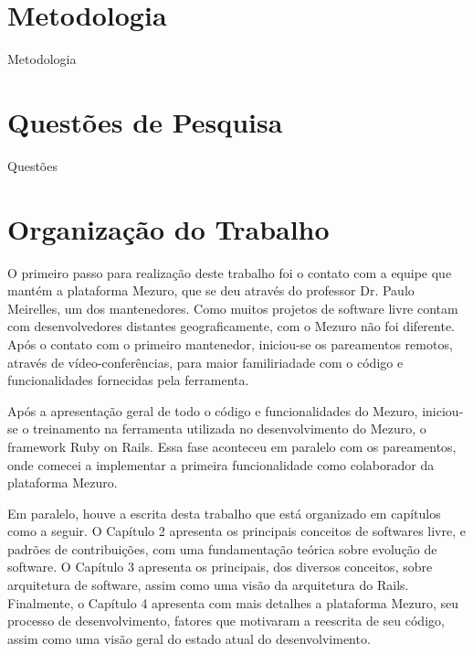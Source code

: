 \section{Metodologia}

Metodologia

\section{Questões de Pesquisa}

Questões

\section{Organização do Trabalho}

O primeiro passo para realização deste trabalho foi o contato com a equipe que mantém a plataforma Mezuro, que se deu através do professor Dr. Paulo Meirelles, um dos mantenedores. Como muitos projetos de software livre contam com desenvolvedores distantes geograficamente, com o Mezuro não foi diferente. Após o contato com o primeiro mantenedor, iniciou-se os pareamentos remotos, através de vídeo-conferências, para maior familiriadade com o código e funcionalidades fornecidas pela ferramenta.

Após a apresentação geral de todo o código e funcionalidades do Mezuro, iniciou-se o treinamento na ferramenta utilizada no desenvolvimento do Mezuro, o framework Ruby on Rails. Essa fase aconteceu em paralelo com os pareamentos, onde comecei a implementar a primeira funcionalidade como colaborador da plataforma Mezuro.

Em paralelo, houve a escrita desta trabalho que está organizado em capítulos como a seguir. O Capítulo 2 apresenta os principais conceitos de softwares livre, e padrões de contribuições, com uma fundamentação teórica sobre evolução de software. O Capítulo 3 apresenta os principais, dos diversos conceitos, sobre arquitetura de software, assim como uma visão da arquitetura do Rails. Finalmente, o Capítulo 4 apresenta com mais detalhes a plataforma Mezuro, seu processo de desenvolvimento, fatores que motivaram a reescrita de seu código, assim como uma visão geral do estado atual do desenvolvimento.

